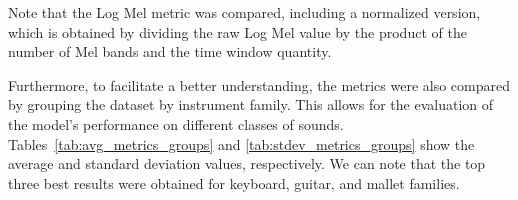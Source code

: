 \documentclass[sigconf,natbib=false]{acmart}
\newcommand{\basg}[1]{{\color{blue}[#1]}}
\begin{document}


Note that the Log Mel metric was compared, including a normalized version, which is obtained by dividing the raw Log Mel value by the product of the number of Mel bands and the time window quantity.



Furthermore, to facilitate a better understanding, the metrics were also compared by grouping the dataset by instrument family. This allows for the evaluation of the model's performance on different classes of sounds. Tables~\ref{tab:avg_metrics_groups} and \ref{tab:stdev_metrics_groups} show the average and standard deviation values, respectively. We can note that the top three best results were obtained for keyboard, guitar, and mallet families.
\end{document}
